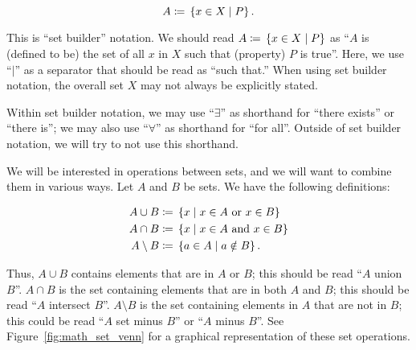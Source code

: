 \begin{equation}
    A \coloneqq{} \left\{ x\in X\mid P \right\}.
\end{equation}

\noindent
This is ``set builder'' notation.
We should read $A \coloneqq{} \left\{ x\in X\mid P \right\}$ as
``$A$ is (defined to be) the set of all $x$ in $X$ such that
(property) $P$ is true''.
Here, we use ``$\mid$'' as a separator that should be read as ``such that.''
When using set builder notation, the overall set $X$ may not always
be explicitly stated.

Within set builder notation, we may use ``$\exists$'' as shorthand
for ``there exists'' or ``there is'';
we may also use ``$\forall$'' as shorthand for ``for all''.
Outside of set builder notation, we will try to not use this shorthand.

We will be interested in operations between sets,
and we will want to combine them in various ways.
Let $A$ and $B$ be sets.
We have the following definitions:

\begin{align}
    A \cup B &\coloneqq{} \left\{ x \mid x\in A \text{ or } x\in B \right\}
        \nonumber\\
    A \cap B &\coloneqq{} \left\{ x \mid x\in A \text{ and } x\in B \right\}
        \nonumber\\
    A \setminus B &\coloneqq{} \left\{ a\in A \mid a\notin B \right\}.
    \label{eq:math_set_theory_basic_set_ops}
\end{align}

\noindent
Thus, $A\cup B$ contains elements that are in $A$ or $B$;
this should be read ``$A$ union $B$''.
$A\cap B$ is the set containing elements that are in both $A$ and $B$;
this should be read ``$A$ intersect $B$''.
$A\setminus B$ is the set containing elements in $A$ that are not in $B$;
this could be read ``$A$ set minus $B$'' or ``$A$ minus $B$''.
See Figure~\ref{fig:math_set_venn} for a graphical representation
of these set operations.



